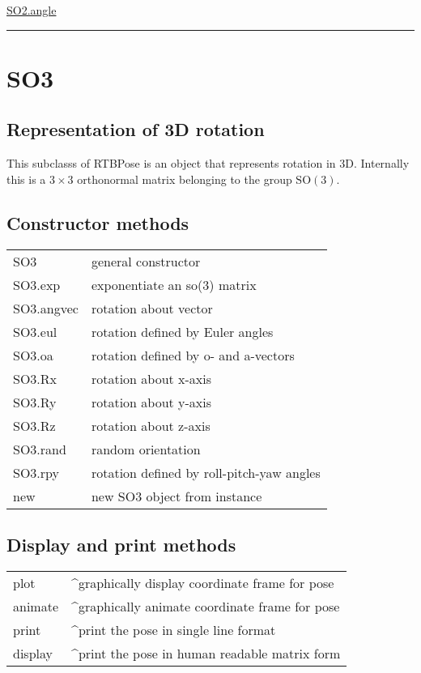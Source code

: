 \hyperlink{SO2.angle}{\color{blue} SO2.angle}

\vspace{1.5ex}\rule{\textwidth}{1mm}

\hypertarget{SO3}{\section*{SO3}}
\subsection*{Representation of 3D rotation}


This subclasss of RTBPose is an object that represents rotation in 3D.
Internally this is a $3 \times 3$ orthonormal matrix belonging to the group $\mbox{SO}(3)$.


\subsection*{Constructor methods}
\begin{longtable}{lp{120mm}}
SO3 & general constructor\\ 
SO3.exp & exponentiate an so(3) matrix\\ 
SO3.angvec & rotation about vector\\ 
SO3.eul & rotation defined by Euler angles\\ 
SO3.oa & rotation defined by o- and a-vectors\\ 
SO3.Rx & rotation about x-axis\\ 
SO3.Ry & rotation about y-axis\\ 
SO3.Rz & rotation about z-axis\\ 
SO3.rand & random orientation\\ 
SO3.rpy & rotation defined by roll-pitch-yaw angles\\ 
new & new SO3 object from instance\\ 
\end{longtable}\vspace{1ex}

\subsection*{Display and print methods}
\begin{longtable}{lp{120mm}}
plot & \textasciicircum graphically display coordinate frame for pose\\ 
animate & \textasciicircum graphically animate coordinate frame for pose\\ 
print & \textasciicircum print the pose in single line format\\ 
display & \textasciicircum print the pose in human readable matrix form\\ 
\end{longtable}\vspace{1ex}

